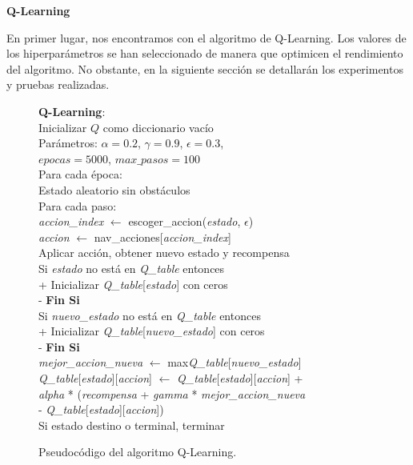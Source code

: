 \documentclass[conference,a4paper]{IEEEtran}
\begin{document}
\textbf{Q-Learning\newline}

En primer lugar, nos encontramos con el algoritmo de Q-Learning. Los valores de los hiperparámetros se han seleccionado de manera que optimicen el rendimiento del algoritmo. 
No obstante, en la siguiente sección se detallarán los experimentos y pruebas realizadas.\newline\newline\newline

\begin{figure}[h]
  \begin{pseudo}[compact]
    \textbf{Q-Learning}: \\
    Inicializar $Q$ como diccionario vacío \\
    Parámetros: $\alpha = 0.2$, $\gamma = 0.9$, $\epsilon = 0.3$, \\ $epocas = 5000$, $max\_pasos = 100$ \\
    Para cada época: \\
    \> Estado aleatorio sin obstáculos \\
    \> Para cada paso: \\
    \> \> \textit{accion\_index} $\leftarrow$ escoger\_accion(\textit{estado}, $\epsilon$) \\
    \> \> \textit{accion} $\leftarrow$ nav\_acciones[\textit{accion\_index}] \\
    \> \> Aplicar acción, obtener nuevo estado y recompensa \\
    Si \textit{estado} no está en \textit{Q\_table} entonces \\+
      Inicializar \textit{Q\_table}[\textit{estado}] con ceros \\-
    \textbf{Fin Si} \\
    Si \textit{nuevo\_estado} no está en \textit{Q\_table} entonces \\+
      Inicializar \textit{Q\_table}[\textit{nuevo\_estado}] con ceros \\-
    \textbf{Fin Si} \\
    \textit{mejor\_accion\_nueva} $\leftarrow$ max\textit{Q\_table}[\textit{nuevo\_estado}] \\
    \textit{Q\_table}[\textit{estado}][\textit{accion}] $\leftarrow$ \textit{Q\_table}[\textit{estado}][\textit{accion}] + \\
    \> \textit{alpha} * (\textit{recompensa} + \textit{gamma} * \textit{mejor\_accion\_nueva}\\
    \> - \textit{Q\_table}[\textit{estado}][\textit{accion}])\\
    \> Si estado destino o terminal, terminar \\
  \end{pseudo}
  \caption{Pseudocódigo del algoritmo Q-Learning.}
  \label{fig:q-learning}
\end{figure}
\end{document}
